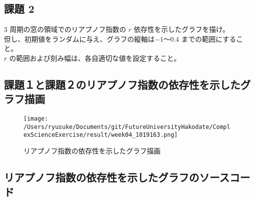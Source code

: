 \documentclass[a4j]{jsarticle}
\begin{document}
\subsection{課題 2}
  3 周期の窓の領域でのリアプノフ指数の $r$ 依存性を示したグラフを描け。\\
但し、初期値をランダムに与え、グラフの縦軸は$-1$～$0.4$ までの範囲にすること。\\
$r$ の範囲および刻み幅は、各自適切な値を設定すること。\\

\subsection{課題１と課題２のリアプノフ指数の依存性を示したグラフ描画}

\begin{figure}[htbp]
\begin{center}
\texttt{[image: /Users/ryusuke/Documents/git/FutureUniversityHakodate/ComplexScienceExercise/result/week04\_1019163.png]}
\caption{リアプノフ指数の依存性を示したグラフ描画}
\end{center}
\end{figure}

\newpage

\subsection{リアプノフ指数の依存性を示したグラフのソースコード}
\end{document}

